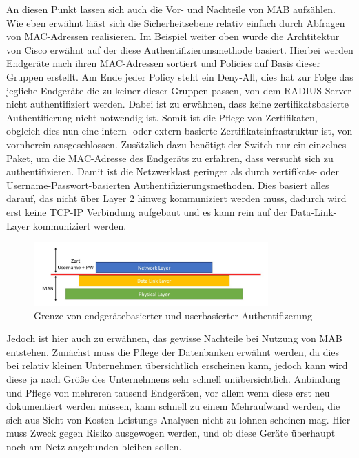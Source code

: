 \documentclass[conference]{IEEEtran}
\begin{document}
%

An diesen Punkt lassen sich auch die Vor- und Nachteile von MAB aufzählen. Wie eben erwähnt lääst sich die Sicherheitsebene relativ einfach durch Abfragen von MAC-Adressen realisieren. Im Beispiel weiter oben wurde die Archtitektur von Cisco erwähnt auf der diese Authentifizierunsmethode basiert. Hierbei werden Endgeräte nach ihren MAC-Adressen sortiert und Policies auf Basis dieser Gruppen erstellt. Am Ende jeder Policy steht ein Deny-All, dies hat zur Folge das jegliche Endgeräte die zu keiner dieser Gruppen passen, von dem RADIUS-Server nicht authentifiziert werden. Dabei ist zu erwähnen, dass keine zertifikatsbasierte Authentifierung nicht notwendig ist. Somit ist die Pflege von Zertifikaten, obgleich dies nun eine intern- oder extern-basierte Zertifikatsinfrastruktur ist, von vornherein ausgeschlossen. Zusätzlich dazu benötigt der Switch nur ein einzelnes Paket, um die MAC-Adresse des Endgeräts zu erfahren, dass versucht sich zu authentifizieren. Damit ist die Netzwerklast geringer als durch zertifikats- oder Username-Passwort-basierten Authentifizierungsmethoden. Dies basiert alles darauf, das nicht über Layer 2 hinweg kommuniziert werden muss, dadurch wird erst keine TCP-IP Verbindung aufgebaut und es kann rein auf der Data-Link-Layer kommuniziert werden.\\

\begin{figure}[hbt]
	\centering
	\includegraphics[width=9cm]{figures/MAB_Layer_2.jpg}
	\caption{Grenze von endgerätebasierter und userbasierter Authentifizerung}
	\label{fig:mab}
\end{figure}

Jedoch ist hier auch zu erwähnen, das gewisse Nachteile bei Nutzung von MAB entstehen. Zunächst muss die Pflege der Datenbanken erwähnt werden, da dies bei relativ kleinen Unternehmen übersichtlich erscheinen kann, jedoch kann wird diese ja nach Größe des Unternehmens sehr schnell unübersichtlich. Anbindung und Pflege von mehreren tausend Endgeräten, vor allem wenn diese erst neu dokumentiert werden müssen, kann schnell zu einem Mehraufwand werden, die sich aus Sicht von Kosten-Leistungs-Analysen nicht zu lohnen scheinen mag. Hier muss Zweck gegen Risiko ausgewogen werden, und ob diese Geräte überhaupt noch am Netz angebunden bleiben sollen.\\
\end{document}
